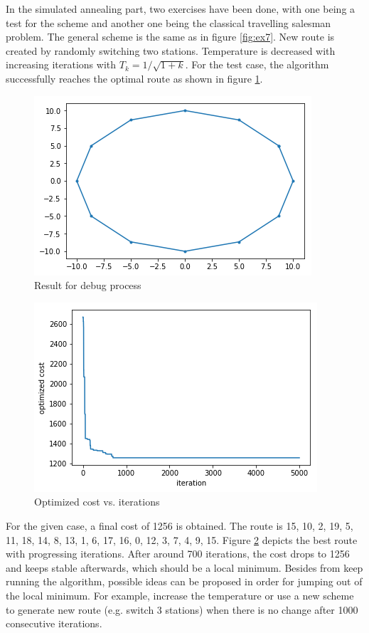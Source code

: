 In the simulated annealing part, two exercises have been done, with one being a test for the scheme and another one being the classical travelling salesman problem. The general scheme is the same as in figure \ref{fig:ex7}. New route is created by randomly switching two stations. Temperature is decreased with increasing iterations with $T_{k}=1 / \sqrt{1+k}$. For the test case, the algorithm successfully reaches the optimal route as shown in figure \ref{fig:debugsen}.
\begin{figure}[H]
    \centering
    \includegraphics{figures/debugsen.png}
    \caption{Result for debug process}
    \label{fig:debugsen}
\end{figure}

\begin{figure}[H]
    \centering
    \includegraphics{figures/annealing.png}
    \caption{Optimized cost vs. iterations}
    \label{fig:annellingSen}
\end{figure}

For the given case, a final cost of 1256 is obtained. The route is 15, 10, 2, 19, 5, 11, 18, 14, 8, 13, 1, 6, 17, 16, 0, 12, 3, 7, 4, 9, 15. Figure \ref{fig:annellingSen} depicts the best route with progressing iterations. After around 700 iterations, the cost drops to 1256 and keeps stable afterwards, which should be a local minimum. Besides from keep running the algorithm, possible ideas can be proposed in order for jumping out of the local minimum. For example, increase the temperature or use a new scheme to generate new route (e.g. switch 3 stations) when there is no change after 1000 consecutive iterations. 

